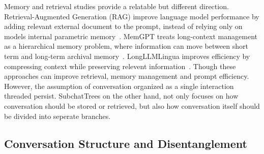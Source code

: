 \documentclass[pdflatex,sn-mathphys-num]{sn-jnl}%
\theoremstyle{thmstyleone}%
\theoremstyle{thmstyletwo}%
\theoremstyle{thmstylethree}%
\begin{document}






Memory and retrieval studies provide a relatable but different direction. Retrieval-Augmented Generation (RAG) improve language model performance by adding relevant external document to the prompt, instead of relying only on models internal parametric memory~\cite{lewis2020rag}. MemGPT treats long-context management as a hierarchical memory problem, where information can move between short term and long-term archival memory~\cite{packer2023memgpt}. LongLLMLingua improves efficiency by compressing context while preserving relevent information~\cite{jiang2024longllmlingua}. Though these approaches can improve retrieval, memory management and prompt efficiency. However, the assumption of conversation organized as a single interaction threaded persist. SubchatTrees on the other hand, not only focuses on how conversation should be stored or retrieved, but also how conversation itself should be divided into seperate branches.






\subsection{Conversation Structure and Disentanglement}\label{subsec:disentangle}

\end{document}
